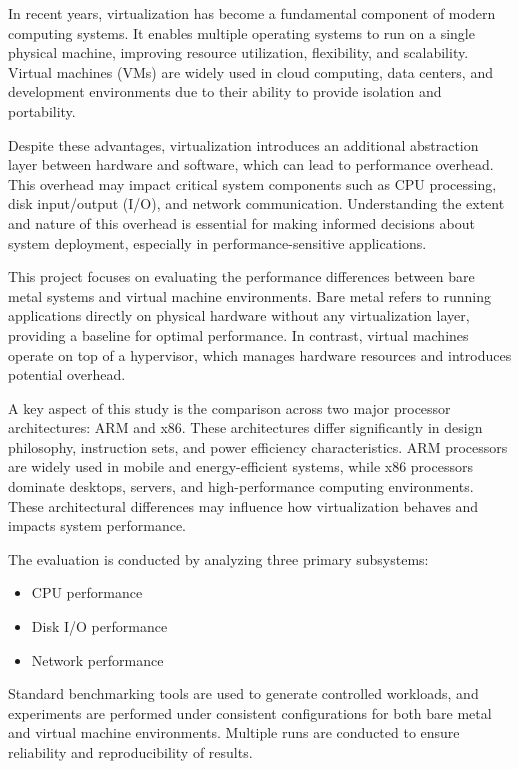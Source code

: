 \documentclass[conference]{IEEEtran}
\begin{document}
In recent years, virtualization has become a fundamental component of modern computing systems. It enables multiple operating systems to run on a single physical machine, improving resource utilization, flexibility, and scalability. Virtual machines (VMs) are widely used in cloud computing, data centers, and development environments due to their ability to provide isolation and portability.

Despite these advantages, virtualization introduces an additional abstraction layer between hardware and software, which can lead to performance overhead. This overhead may impact critical system components such as CPU processing, disk input/output (I/O), and network communication. Understanding the extent and nature of this overhead is essential for making informed decisions about system deployment, especially in performance-sensitive applications.

This project focuses on evaluating the performance differences between bare metal systems and virtual machine environments. Bare metal refers to running applications directly on physical hardware without any virtualization layer, providing a baseline for optimal performance. In contrast, virtual machines operate on top of a hypervisor, which manages hardware resources and introduces potential overhead.

A key aspect of this study is the comparison across two major processor architectures: ARM and x86. These architectures differ significantly in design philosophy, instruction sets, and power efficiency characteristics. ARM processors are widely used in mobile and energy-efficient systems, while x86 processors dominate desktops, servers, and high-performance computing environments. These architectural differences may influence how virtualization behaves and impacts system performance.

The evaluation is conducted by analyzing three primary subsystems:
\begin{itemize}
    \item CPU performance
    \item Disk I/O performance
    \item Network performance
\end{itemize}

Standard benchmarking tools are used to generate controlled workloads, and experiments are performed under consistent configurations for both bare metal and virtual machine environments. Multiple runs are conducted to ensure reliability and reproducibility of results.
\end{document}
